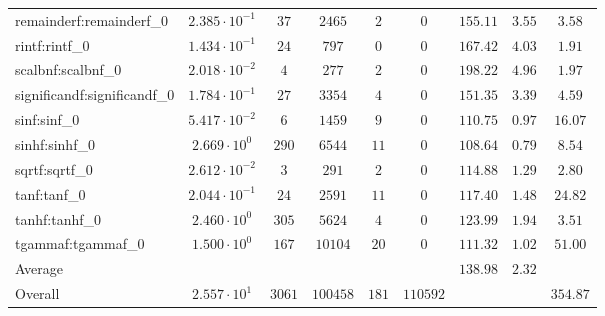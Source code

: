 \begin{tabular}{|l|c|c|c|c|c|c|c|c|}
remainderf:remainderf\_0     & $ 2.385 \cdot 10^{-1} $ & $ 37     $ & $ 2465   $ & $ 2   $ & $ 0      $ & $ 155.11      $ & $ 3.55    $ & $ 3.58    $ \\
rintf:rintf\_0               & $ 1.434 \cdot 10^{-1} $ & $ 24     $ & $ 797    $ & $ 0   $ & $ 0      $ & $ 167.42      $ & $ 4.03    $ & $ 1.91    $ \\
scalbnf:scalbnf\_0           & $ 2.018 \cdot 10^{-2} $ & $ 4      $ & $ 277    $ & $ 2   $ & $ 0      $ & $ 198.22      $ & $ 4.96    $ & $ 1.97    $ \\
significandf:significandf\_0 & $ 1.784 \cdot 10^{-1} $ & $ 27     $ & $ 3354   $ & $ 4   $ & $ 0      $ & $ 151.35      $ & $ 3.39    $ & $ 4.59    $ \\
sinf:sinf\_0                 & $ 5.417 \cdot 10^{-2} $ & $ 6      $ & $ 1459   $ & $ 9   $ & $ 0      $ & $ 110.75      $ & $ 0.97    $ & $ 16.07   $ \\
sinhf:sinhf\_0               & $ 2.669 \cdot 10^{0}  $ & $ 290    $ & $ 6544   $ & $ 11  $ & $ 0      $ & $ 108.64      $ & $ 0.79    $ & $ 8.54    $ \\
sqrtf:sqrtf\_0               & $ 2.612 \cdot 10^{-2} $ & $ 3      $ & $ 291    $ & $ 2   $ & $ 0      $ & $ 114.88      $ & $ 1.29    $ & $ 2.80    $ \\
tanf:tanf\_0                 & $ 2.044 \cdot 10^{-1} $ & $ 24     $ & $ 2591   $ & $ 11  $ & $ 0      $ & $ 117.40      $ & $ 1.48    $ & $ 24.82   $ \\
tanhf:tanhf\_0               & $ 2.460 \cdot 10^{0}  $ & $ 305    $ & $ 5624   $ & $ 4   $ & $ 0      $ & $ 123.99      $ & $ 1.94    $ & $ 3.51    $ \\
tgammaf:tgammaf\_0           & $ 1.500 \cdot 10^{0}  $ & $ 167    $ & $ 10104  $ & $ 20  $ & $ 0      $ & $ 111.32      $ & $ 1.02    $ & $ 51.00   $ \\
\hline
Average                      & $                     $ & $        $ & $        $ & $     $ & $        $ & $ 138.98      $ & $ 2.32    $ & $         $ \\
\hline
Overall                      & $ 2.557 \cdot 10^{1}  $ & $ 3061   $ & $ 100458 $ & $ 181 $ & $ 110592 $ & $             $ & $         $ & $ 354.87  $ \\
\hline
\end{tabular}

